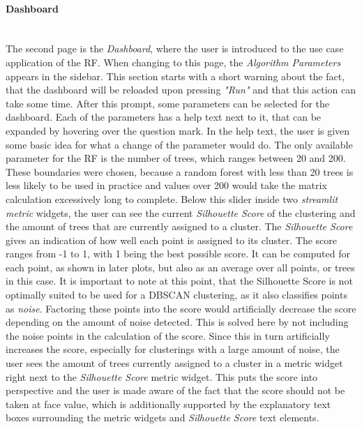 \documentclass[a4paper, 12pt]{article}
\begin{document}
\paragraph{Dashboard}\mbox{}\\
The second page is the \textit{Dashboard}, where the user is introduced to the use case application
of the RF. When changing to this page, the \textit{Algorithm Parameters} appears in the sidebar. This
section starts with a short warning about the fact, that the dashboard will be reloaded upon pressing
\textit{"Run"} and that this action can take some time.
After this prompt, some parameters can be selected for the dashboard. Each of the parameters has a
help text next to it, that can be expanded by hovering over the question mark. In the help text,
the user is given some basic idea for what a change of the parameter would do.
The only available parameter for
the RF is the number of trees, which ranges between 20 and 200. These boundaries were chosen, because
a random forest with less than 20 trees is less likely to be used in practice and values over 200
would take the matrix calculation excessively long to complete.
Below this slider inside two \textit{streamlit metric} widgets, the user can see the current
\textit{Silhouette Score} \cite{rousseeuw1987silhouettes} of the clustering and the amount of trees that
are currently assigned to a cluster. The \textit{Silhouette Score} gives an indication of how well each
point is assigned to its cluster. The score ranges from -1 to 1, with 1 being the best possible score.
It can be computed for each point, as shown in later plots, but also as an average over all points, or
trees in this case. It is important to note at this point, that the Silhouette Score is not optimally
suited to be used for a DBSCAN clustering, as it also classifies points as \textit{noise}. Factoring
these points into the score would artificially decrease the score depending on the amount of noise
detected. This is solved here by not including the noise points in the calculation of the score.
Since this in turn artificially increases the score, especially for clusterings with a large amount of
noise, the user sees the amount of trees currently assigned to a cluster in a metric widget right next
to the \textit{Silhouette Score} metric widget. This puts the score into perspective and the user is
made aware of the fact that the score should not be taken at face value, which is additionally supported
by the explanatory text boxes surrounding the metric widgets and \textit{Silhouette Score} text elements.
\par
\end{document}
